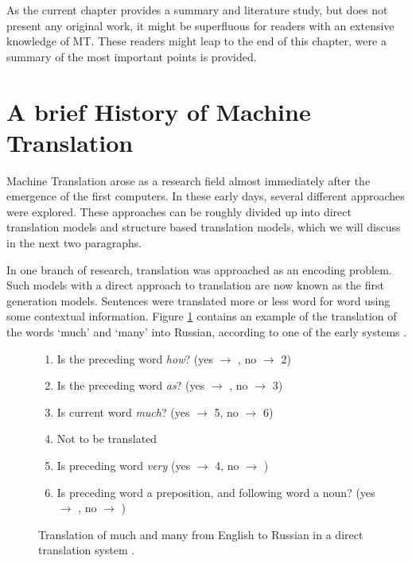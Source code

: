 As the current chapter provides a summary and literature study, but does not present any original work, it might be superfluous for readers with an extensive knowledge of MT. These readers might leap to the end of this chapter, were a summary of the most important points is provided.

\section{A brief History of Machine Translation}
\label{sec:overview}

Machine Translation arose as a research field almost immediately after the emergence of the first computers. In these early days, several different approaches were explored. These approaches can be roughly divided up into direct translation models and structure based translation models, which we will discuss in the next two paragraphs.

In one branch of research, translation was approached as an encoding problem. Such models with a direct approach to translation are now known as the first generation models. Sentences were translated more or less word for word using some contextual information. Figure \ref{fig:georgetown} contains an example of the translation of the words `much' and `many' into Russian, according to one of the early systems \citep{dostert1955georgetown}.

\begin{figure}[!ht]
\begin{framed}
\footnotesize{
\begin{enumerate}
\item[1] Is the preceding word \textit{how}? (yes $\rightarrow$ , no $\rightarrow$ 2)
\item[2] Is the preceding word \textit{as}? (yes $\rightarrow$ , no $\rightarrow$ 3)
\item[3] Is current word \textit{much}? (yes $\rightarrow$ 5, no $\rightarrow$ 6)
\item[4] Not to be translated
\item[5] Is preceding word \textit{very} (yes $\rightarrow$ 4, no $\rightarrow$ )
\item[6] Is preceding word a preposition, and following word a noun? (yes $\rightarrow$ , no $\rightarrow$ )
\end{enumerate}
}
\end{framed}
\caption{Translation of much and many from English to Russian in a direct translation system \citep[source][p.56]{hutchins1992introduction}.}\label{fig:georgetown}
\end{figure}

